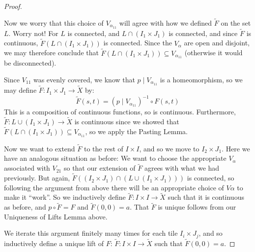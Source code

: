 \begin{proof}
\begin{enumerate}
	Now we worry that this choice of $V_{\alpha_{11}}$ will agree with how we defined $\tilde{F}$ on the set $L$. Worry not! For $L$ is connected, and $L\cap (I_1\times J_1)$ is connected, and since $\tilde{F}$ is continuous, $\tilde{F}(L\cap (I_1\times J_1))$ is connected. Since the $V_\alpha$ are open and disjoint, we may therefore conclude that $\tilde{F}(L\cap (I_1\times J_1))\subseteq V_{\alpha_{11}}$ (otherwise it would be disconnected).

	Since $V_11$ was evenly covered, we know that $p\mid V_{\alpha_{11}}$ is a homeomorphism, so we may define $\tilde{F}\colon I_1\times J_1\to \tilde{X}$ by:
	\[ \tilde{F}(s,t)=(p\mid V_{\alpha_{11}})^{-1}\circ F(s,t) \]
	This is a composition of continuous functions, so is continuous. Furthermore, $\tilde{F}\colon L\cup (I_1\times J_1)\to \tilde{X}$ is continuous since we showed that $\tilde{F}(L\cap (I_1\times J_1))\subseteq V_{\alpha_{11}}$, so we apply the Pasting Lemma.

    Now we want to extend $\tilde{F}$ to the rest of $I\times I$, and so we move to $I_2\times J_1$. Here we have an analogous situation as before: We want to choose the appropriate $V_\alpha$ associated with $V_{21}$ so that our extension of $\tilde{F}$ agrees with what we had previously. But again, $\tilde{F}((I_2\times J_1)\cap (L\cup (I_1\times J_1)))$ is connected, so following the argument from above there will be an appropriate choice of $V\alpha$ to make it ``work''. So we inductively define $\tilde{F}\colon I\times I\to \tilde{X}$ such that it is continuous as before, and $p\circ \tilde{F}=F$ and $\tilde{F}(0,0)=a$. That $\tilde{F}$ is unique follows from our Uniqueness of Lifts Lemma above.
    \end{enumerate}

We iterate this argument finitely many times for each tile $I_i\times J_j$, and so inductively define a unique lift of $F$: $\tilde{F}\colon I\times I\to \tilde{X}$ such that $\tilde{F}(0,0)=a$.
  \end{proof}


